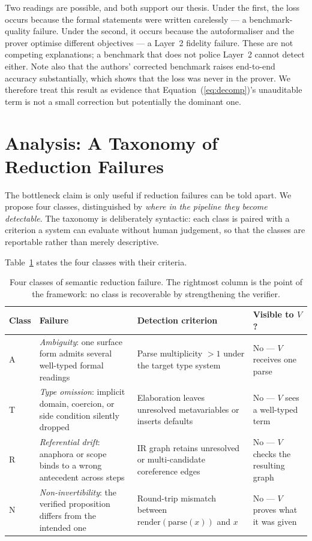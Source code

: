 \documentclass[11pt,a4paper]{article}
\begin{document}
Two readings are possible, and both support our thesis.  Under the first, the
loss occurs because the formal statements were written carelessly --- a
benchmark-quality failure.  Under the second, it occurs because the
autoformaliser and the prover optimise different objectives --- a
Layer~2 fidelity failure.  These are not competing explanations; a benchmark
that does not police Layer~2 cannot detect either.  Note also that the authors'
corrected benchmark raises end-to-end accuracy substantially, which shows that
the loss was never in the prover.  We therefore treat this result as evidence
that Equation~(\ref{eq:decomp})'s unauditable term is not a small correction but
potentially the dominant one.

\section{Analysis: A Taxonomy of Reduction Failures}
\label{sec:taxonomy}

The bottleneck claim is only useful if reduction failures can be told apart.
We propose four classes, distinguished by \emph{where in the pipeline they
become detectable}.  The taxonomy is deliberately syntactic: each class is
paired with a criterion a system can evaluate without human judgement, so that
the classes are reportable rather than merely descriptive.

Table~\ref{tab:taxonomy} states the four classes with their criteria.

\begin{table}[t]
\centering
\caption{Four classes of semantic reduction failure.  The rightmost column is
the point of the framework: no class is recoverable by strengthening the
verifier.}
\label{tab:taxonomy}
\small
\begin{tabular}{@{}lp{5.0cm}p{4.6cm}p{2.1cm}@{}}
\toprule
Class & Failure & Detection criterion & Visible to $V$? \\
\midrule
A & \emph{Ambiguity}: one surface form admits several well-typed formal readings
  & Parse multiplicity $>1$ under the target type system & No --- $V$ receives one parse \\
\addlinespace
T & \emph{Type omission}: implicit domain, coercion, or side condition silently dropped
  & Elaboration leaves unresolved metavariables or inserts defaults & No --- $V$ sees a well-typed term \\
\addlinespace
R & \emph{Referential drift}: anaphora or scope binds to a wrong antecedent across steps
  & IR graph retains unresolved or multi-candidate coreference edges & No --- $V$ checks the resulting graph \\
\addlinespace
N & \emph{Non-invertibility}: the verified proposition differs from the intended one
  & Round-trip mismatch between $\mathrm{render}(\mathrm{parse}(x))$ and $x$ & No --- $V$ proves what it was given \\
\bottomrule
\end{tabular}
\end{table}
\end{document}
